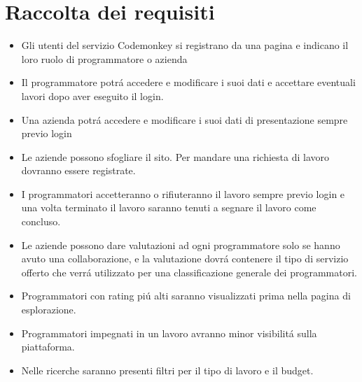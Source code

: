 \section {Raccolta dei requisiti}
\begin{itemize}

\item Gli utenti del servizio Codemonkey si registrano da una pagina e indicano il loro ruolo di programmatore o azienda
\item Il programmatore potrá accedere e modificare i suoi dati e accettare eventuali lavori dopo aver eseguito il login.
\item Una azienda potrá accedere e modificare i suoi dati di presentazione sempre previo login
\item Le aziende possono sfogliare il sito. Per mandare una richiesta di lavoro dovranno essere registrate.
\item I programmatori accetteranno o rifiuteranno il lavoro sempre previo login e una volta terminato il lavoro saranno tenuti a segnare il lavoro come concluso.
\item Le aziende possono dare valutazioni ad ogni programmatore solo se hanno avuto una collaborazione, e la valutazione dovrá contenere il tipo di servizio offerto che verrá utilizzato per una classificazione generale dei programmatori.
\item Programmatori con rating piú alti saranno visualizzati prima nella pagina di esplorazione.
\item Programmatori impegnati in un lavoro avranno minor visibilitá sulla piattaforma.
\item Nelle ricerche saranno presenti filtri per il tipo di lavoro e il budget.
\end{itemize}
